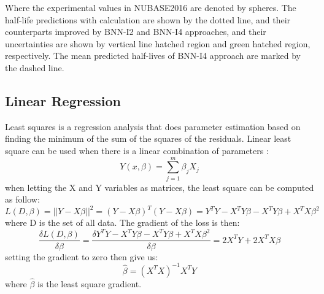 Where the experimental values in NUBASE2016 are denoted by spheres. The half-life predictions with calculation are shown by the dotted line, and their counterparts improved by BNN-I2 and BNN-I4 approaches, and their uncertainties are shown by vertical line hatched region and green hatched region, respectively. The mean predicted half-lives of BNN-I4 approach are marked by the dashed line.

\subsection{Linear Regression}
Least squares is a regression analysis that does parameter estimation based on finding the minimum of the sum of the squares of the residuals. Linear least square can be used when there is a linear combination of parameters :
\begin{equation}
	Y(x,\beta)=\sum_{j=1}^{m}\beta_{j}X_{j}
\end{equation}
when letting the X and Y variables as matrices, the least square can be computed as follow:
\begin{equation}
	L(D,\beta)=||Y-X\beta||^{2}
	=(Y-X\beta)^{T}(Y-X\beta)
	=Y^{T}Y-X^{T}Y\beta -X^{T}Y\beta +X^{T}X\beta^{2}
\end{equation}
where D is the set of all data. The gradient of the loss is then:
\begin{equation}
	\frac{\delta L(D,\beta)}{\delta\beta}=
	\frac{\delta Y^{T}Y-X^{T}Y\beta -X^{T}Y\beta +X^{T}X\beta^{2}}{\delta\beta}=2X^{T}Y+2X^{T}X\beta
\end{equation}
setting the gradient to zero then give us:
\begin{equation}
	\hat{\beta}=(X^{T}X)^{-1}X^{T}Y
	\label{Eq:leastsq}
\end{equation}
where $\hat{\beta}$ is the least square gradient.